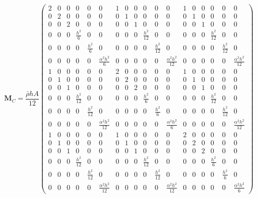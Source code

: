 \begin{equation} 
\mathbf{M}_C
=
\frac{\bar{\rho} h A}{12}
\begin{pmatrix}
2 & 0 & 0 & 0 & 0 & 0 & %
1 & 0 & 0 & 0 & 0 & 0 & 
1 & 0 & 0 & 0 & 0 & 0 
\\
0 & 2 & 0 & 0 & 0 & 0 & 
0 & 1 & 0 & 0 & 0 & 0 & 
0 & 1 & 0 & 0 & 0 & 0 
\\
0 & 0 & 2 & 0 & 0 & 0 & 
0 & 0 & 1 & 0 & 0 & 0 & 
0 & 0 & 1 & 0 & 0 & 0 
\\
0 & 0 & 0 & \frac{h^2}{6} & 0 & 0 & 
0 & 0 & 0 & \frac{h^2}{12} & 0 & 0 & 
0 & 0 & 0 & \frac{h^2}{12} & 0 & 0 
\\
0 & 0 & 0 & 0 & \frac{h^2}{6} & 0 & 
0 & 0 & 0 & 0 & \frac{h^2}{12} & 0 & 
0 & 0 & 0 & 0 & \frac{h^2}{12} & 0  
\\
0 & 0 & 0 & 0 & 0 & \frac{\alpha^2h^2}{6}  & 
0 & 0 & 0 & 0 & 0 & \frac{\alpha^2h^2}{12} & 
0 & 0 & 0 & 0 & 0 & \frac{\alpha^2h^2}{12}  
\\
1 & 0 & 0 & 0 & 0 & 0 & %
2 & 0 & 0 & 0 & 0 & 0 & 
1 & 0 & 0 & 0 & 0 & 0 
\\
0 & 1 & 0 & 0 & 0 & 0 & 
0 & 2 & 0 & 0 & 0 & 0 & 
0 & 1 & 0 & 0 & 0 & 0 
\\
0 & 0 & 1 & 0 & 0 & 0 & 
0 & 0 & 2 & 0 & 0 & 0 & 
0 & 0 & 1 & 0 & 0 & 0 
\\
0 & 0 & 0 & \frac{h^2}{12} & 0 & 0 & 
0 & 0 & 0 & \frac{h^2}{6} & 0 & 0 & 
0 & 0 & 0 & \frac{h^2}{12} & 0 & 0 
\\
0 & 0 & 0 & 0 & \frac{h^2}{12} & 0 & 
0 & 0 & 0 & 0 & \frac{h^2}{6} & 0 & 
0 & 0 & 0 & 0 & \frac{h^2}{12} & 0  
\\
0 & 0 & 0 & 0 & 0 & \frac{\alpha^2h^2}{12}  & 
0 & 0 & 0 & 0 & 0 & \frac{\alpha^2h^2}{6} & 
0 & 0 & 0 & 0 & 0 & \frac{\alpha^2h^2}{12}  
\\
1 & 0 & 0 & 0 & 0 & 0 & %
1 & 0 & 0 & 0 & 0 & 0 & 
2 & 0 & 0 & 0 & 0 & 0 
\\
0 & 1 & 0 & 0 & 0 & 0 & 
0 & 1 & 0 & 0 & 0 & 0 & 
0 & 2 & 0 & 0 & 0 & 0 
\\
0 & 0 & 1 & 0 & 0 & 0 & 
0 & 0 & 1 & 0 & 0 & 0 & 
0 & 0 & 2 & 0 & 0 & 0 
\\
0 & 0 & 0 & \frac{h^2}{12} & 0 & 0 & 
0 & 0 & 0 & \frac{h^2}{12} & 0 & 0 & 
0 & 0 & 0 & \frac{h^2}{6} & 0 & 0 
\\
0 & 0 & 0 & 0 & \frac{h^2}{12} & 0 & 
0 & 0 & 0 & 0 & \frac{h^2}{12} & 0 & 
0 & 0 & 0 & 0 & \frac{h^2}{6} & 0  
\\
0 & 0 & 0 & 0 & 0 & \frac{\alpha^2h^2}{12}  & 
0 & 0 & 0 & 0 & 0 & \frac{\alpha^2h^2}{12} & 
0 & 0 & 0 & 0 & 0 & \frac{\alpha^2h^2}{6}  
\end{pmatrix}
\label{eqt17_11}
\end{equation}


